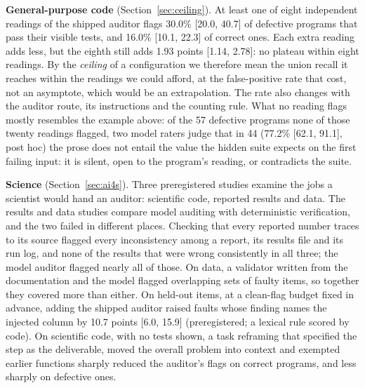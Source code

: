 \textbf{General-purpose code} (Section~\ref{sec:ceiling}). At least one of eight independent
readings of the shipped auditor flags 30.0\% [20.0, 40.7] of defective programs that pass their
visible tests, and 16.0\% [10.1, 22.3] of correct ones. Each extra reading adds less, but the eighth
still adds 1.93 points [1.14, 2.78]: no plateau within eight readings. By the \emph{ceiling} of a configuration we therefore mean the union recall it reaches within the readings we could afford, at the false-positive rate that cost, not an asymptote, which would be an extrapolation. The rate also changes with the
auditor route, its instructions and the counting rule. What no reading flags mostly resembles the
example above: of the 57 defective programs none of those twenty readings flagged,
two model raters judge that in 44 (77.2\% [62.1, 91.1], post hoc) the prose does not entail the value the hidden suite expects on the first failing input: it is silent, open to the program's reading, or contradicts the suite.

\textbf{Science} (Section~\ref{sec:ai4s}). Three preregistered studies examine the jobs a scientist
would hand an auditor: scientific code, reported results and data. The results and data studies
compare model auditing with deterministic verification, and the two failed in different places.
Checking that every reported number traces to its source flagged every inconsistency among a report,
its results file and its run log, and none of the results that were wrong consistently in all three;
the model auditor flagged nearly all of those. On data, a validator written from the documentation
and the model flagged overlapping sets of faulty items, so together they covered more than either. On held-out items, at a clean-flag budget fixed in advance, adding the shipped auditor raised faults whose finding names the injected column by 10.7 points [6.0, 15.9] (preregistered; a lexical rule scored by code). On
scientific code, with no tests shown, a task reframing that specified the step as the deliverable,
moved the overall problem into context and exempted earlier functions sharply reduced the auditor's
flags on correct programs, and less sharply on defective ones.

